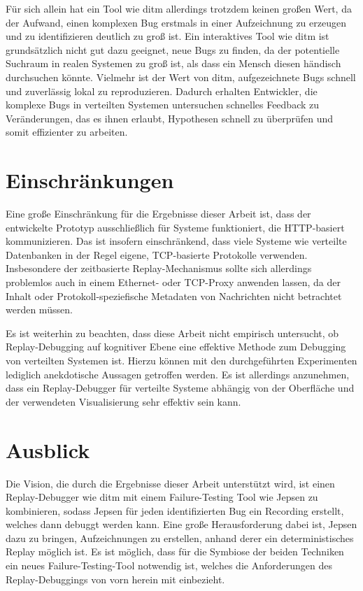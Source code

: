 \documentclass[12pt,a4paper]{report}
\begin{document}
Für sich allein hat ein Tool wie ditm allerdings trotzdem keinen großen Wert, da der Aufwand, einen komplexen Bug erstmals in
einer Aufzeichnung zu erzeugen und zu identifizieren deutlich zu groß ist. Ein interaktives Tool wie ditm ist grundsätzlich
nicht gut dazu geeignet, neue Bugs zu finden, da der potentielle Suchraum in realen Systemen zu groß ist, als dass ein Mensch
diesen händisch durchsuchen könnte. Vielmehr ist der Wert von ditm, aufgezeichnete Bugs schnell und zuverlässig lokal zu
reproduzieren. Dadurch erhalten Entwickler, die komplexe Bugs in verteilten Systemen untersuchen schnelles Feedback zu
Veränderungen, das es ihnen erlaubt, Hypothesen schnell zu überprüfen und somit effizienter zu arbeiten.

\section{Einschränkungen}
Eine große Einschränkung für die Ergebnisse dieser Arbeit ist, dass der entwickelte Prototyp ausschließlich für Systeme
funktioniert, die HTTP-basiert kommunizieren. Das ist insofern einschränkend, dass viele Systeme wie verteilte Datenbanken in der
Regel eigene, TCP-basierte Protokolle verwenden. Insbesondere der zeitbasierte Replay-Mechanismus sollte sich allerdings
problemlos auch in einem Ethernet- oder TCP-Proxy anwenden lassen, da der Inhalt oder Protokoll-speziefische Metadaten von
Nachrichten nicht betrachtet werden müssen.

Es ist weiterhin zu beachten, dass diese Arbeit nicht empirisch untersucht, ob Replay-Debugging auf kognitiver Ebene eine
effektive Methode zum Debugging von verteilten Systemen ist. Hierzu können mit den durchgeführten Experimenten lediglich
anekdotische Aussagen getroffen werden. Es ist allerdings anzunehmen, dass ein Replay-Debugger für verteilte Systeme abhängig von
der Oberfläche und der verwendeten Visualisierung sehr effektiv sein kann.

\section{Ausblick}
Die Vision, die durch die Ergebnisse dieser Arbeit unterstützt wird, ist einen Replay-Debugger wie ditm mit einem Failure-Testing Tool
wie Jepsen zu kombinieren, sodass Jepsen für jeden identifizierten Bug ein Recording erstellt, welches dann debuggt werden kann.
Eine große Herausforderung dabei ist, Jepsen dazu zu bringen, Aufzeichnungen zu erstellen, anhand derer ein deterministisches
Replay möglich ist. Es ist möglich, dass für die Symbiose der beiden Techniken ein neues Failure-Testing-Tool notwendig ist,
welches die Anforderungen des Replay-Debuggings von vorn herein mit einbezieht.
\end{document}
